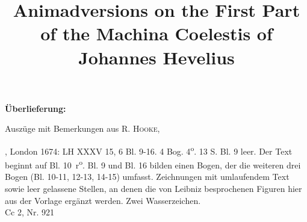 \begin{ledgroupsized}[r]{120mm}
\footnotesize 
\pstart 
\noindent\textbf{\"{U}berlieferung:}
\pend
\end{ledgroupsized}
\begin{ledgroupsized}[r]{114mm}
\footnotesize 
\pstart \parindent -6mm
Auszüge mit Bemerkungen aus R. \textsc{Hooke},\cite{00332} \title{Animadversions on the First Part of the Machina Coelestis of Johannes Hevelius}, London 1674: LH XXXV 15, 6 Bl. 9-16. 4 Bog. 4\textsuperscript{o}. 13  S. Bl. 9 leer. Der Text beginnt auf Bl. 10~r\textsuperscript{o}. Bl. 9 und Bl. 16 bilden einen Bogen, der die weiteren drei Bogen (Bl. 10-11, 12-13, 14-15) umfasst. Zeichnungen mit umlaufendem Text sowie leer gelassene Stellen, an denen die von Leibniz besprochenen Figuren hier aus der Vorlage erg\"{a}nzt werden. Zwei Wasserzeichen.\\ Cc 2, Nr. 921 \pend
\end{ledgroupsized}

